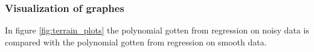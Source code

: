 \subsubsection{Visualization of graphes}
In figure \eqref{fig:terrain_plots} the polynomial gotten from regression on noisy data is compared with the polynomial gotten from regression on smooth data. 


\begin{figure} [H]%
	\centering
	\\
	

\end{figure}

